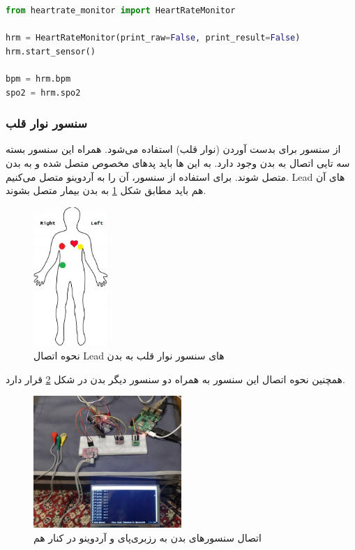 \begin{latin}
	\begin{lstlisting}[language=python]
from heartrate_monitor import HeartRateMonitor

hrm = HeartRateMonitor(print_raw=False, print_result=False)
hrm.start_sensor()

bpm = hrm.bpm
spo2 = hrm.spo2

\end{lstlisting}
\end{latin}


	

\subsubsection{سنسور نوار قلب}


از سنسور  برای بدست‌ آوردن  (نوار قلب) استفاده می‌شود. همراه این سنسور بسته  سه تایی اتصال به بدن وجود دارد. به این  ها باید پد‌های مخصوص متصل شده و به بدن متصل شوند. برای استفاده از سنسور،‌ آن را به آردوینو متصل می‌کنیم. Lead های‌ آن هم باید مطابق شکل \ref{fig:6} به بدن بیمار متصل بشوند.

\begin{figure}[h]
	\centering
	\includegraphics[width=0.25\textwidth]{figs/ecg.jpg}
	
	\caption{نحوه اتصال Lead‌ های سنسور نوار قلب به بدن}
	\label{fig:6}
\end{figure}



همچنین نحوه اتصال این سنسور به همراه دو سنسور دیگر بدن در شکل \ref{fig:7} قرار دارد.


\begin{figure}[h]
	\centering
	\includegraphics[width=0.5\textwidth]{figs/allbody.jpg}
	
	\caption{اتصال سنسورهای بدن به رزبری‌پای و آردوینو در کنار هم}
	\label{fig:7}
\end{figure}


